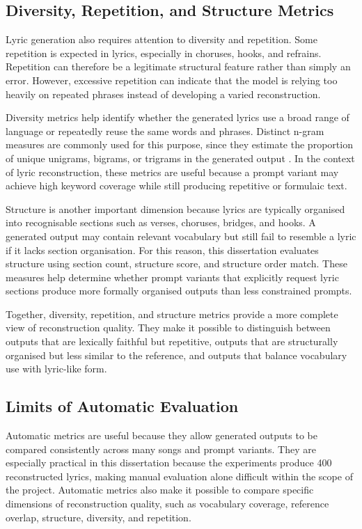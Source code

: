 \subsection{Diversity, Repetition, and Structure Metrics}

Lyric generation also requires attention to diversity and repetition. Some repetition is expected in lyrics, especially in choruses, hooks, and refrains. Repetition can therefore be a legitimate structural feature rather than simply an error. However, excessive repetition can indicate that the model is relying too heavily on repeated phrases instead of developing a varied reconstruction.

Diversity metrics help identify whether the generated lyrics use a broad range of language or repeatedly reuse the same words and phrases. Distinct n-gram measures are commonly used for this purpose, since they estimate the proportion of unique unigrams, bigrams, or trigrams in the generated output \cite{li2016diversity}. In the context of lyric reconstruction, these metrics are useful because a prompt variant may achieve high keyword coverage while still producing repetitive or formulaic text.

Structure is another important dimension because lyrics are typically organised into recognisable sections such as verses, choruses, bridges, and hooks. A generated output may contain relevant vocabulary but still fail to resemble a lyric if it lacks section organisation. For this reason, this dissertation evaluates structure using section count, structure score, and structure order match. These measures help determine whether prompt variants that explicitly request lyric sections produce more formally organised outputs than less constrained prompts.

Together, diversity, repetition, and structure metrics provide a more complete view of reconstruction quality. They make it possible to distinguish between outputs that are lexically faithful but repetitive, outputs that are structurally organised but less similar to the reference, and outputs that balance vocabulary use with lyric-like form.

\subsection{Limits of Automatic Evaluation}

Automatic metrics are useful because they allow generated outputs to be compared consistently across many songs and prompt variants. They are especially practical in this dissertation because the experiments produce 400 reconstructed lyrics, making manual evaluation alone difficult within the scope of the project. Automatic metrics also make it possible to compare specific dimensions of reconstruction quality, such as vocabulary coverage, reference overlap, structure, diversity, and repetition.

